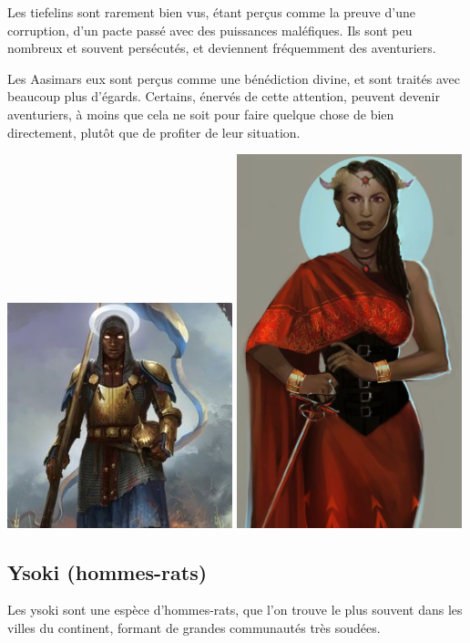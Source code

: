 \documentclass[10pt,a4paper]{book}
\begin{document}
Les tiefelins sont rarement bien vus, étant perçus comme la preuve d'une corruption, d'un pacte passé avec des puissances maléfiques. Ils sont peu nombreux et souvent persécutés, et deviennent fréquemment des aventuriers.

Les Aasimars eux sont perçus comme une bénédiction divine, et sont traités avec beaucoup plus d'égards. Certains, énervés de cette attention, peuvent devenir aventuriers, à moins que cela ne soit pour faire quelque chose de bien directement, plutôt que de profiter de leur situation.

\includegraphics[width=0.49\textwidth]{aasimar 1}
\includegraphics[width=0.49\textwidth]{tieflin 1}
\subsection{Ysoki (hommes-rats)}
Les ysoki sont une espèce d'hommes-rats, que l'on trouve le plus souvent dans les villes du continent, formant de grandes communautés très soudées. 
\end{document}
